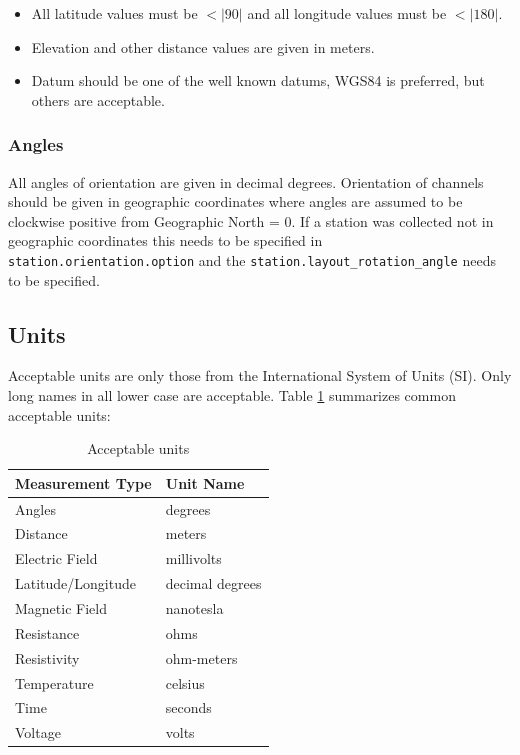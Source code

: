 \documentclass[12pt]{article}
\begin{document}
\begin{itemize}
	\setlength\itemsep{0em}
	\item All latitude values must be $<|90|$ and all longitude values must be $<|180|$.
	\item Elevation and other distance values are given in meters.
	\item Datum should be one of the well known datums, WGS84 is preferred, but others are acceptable.
\end{itemize} 

\subsubsection{Angles}

All angles of orientation are given in decimal degrees.  Orientation of channels should be given in geographic coordinates where angles are assumed to be clockwise positive from Geographic North = 0.  If a station was collected not in geographic coordinates this needs to be specified in \verb|station.orientation.option| and the \verb|station.layout_rotation_angle| needs to be specified.   

\subsection{Units}
Acceptable units are only those from the International System of Units (SI).  Only long names in all lower case are acceptable.  Table \ref{tab:units} summarizes common acceptable units:


\begin{table}[!h]
	\centering
	\caption[Acceptable units]{Acceptable units}
	\begin{tabular}{ll}
		\toprule
		\textbf{Measurement Type} & \textbf{Unit Name} \\ \midrule
		Angles & degrees \\ \midrule
		
		Distance &  meters  \\ \midrule
		Electric Field & millivolts\\ \midrule
		Latitude/Longitude & decimal degrees \\ \midrule
		Magnetic Field & nanotesla \\ \midrule
		Resistance & ohms   \\ \midrule
		Resistivity & ohm-meters \\ \midrule
		Temperature & celsius\\ \midrule
		Time & seconds\\ \midrule
		Voltage & volts \\ \bottomrule
		
		
	\end{tabular}
	\label{tab:units}
\end{table}
\end{document}
